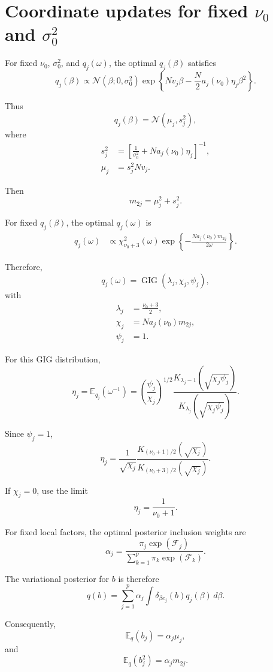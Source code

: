 \documentclass[11pt]{article}
\newcommand{\nuo}{\nu_0}
\newcommand{\sigb}{\sigma_0^2}
\newcommand{\E}{\mathbb E}
\newcommand{\Normal}{\mathcal N}
\newcommand{\GIG}{\operatorname{GIG}}
\newcommand{\chisq}{\chi^2}
\begin{document}
\section{Coordinate updates for fixed \(\nuo\) and \(\sigb\)}

For fixed \(\nuo\), \(\sigb\), and \(q_j(\omega)\), the optimal \(q_j(\beta)\) satisfies
\[
q_j(\beta)
\propto
\Normal(\beta;0,\sigb)
\exp\left\{
Nv_j\beta
-
\frac N2 a_j(\nuo)\eta_j\beta^2
\right\}.
\]

Thus
\[
q_j(\beta)=\Normal(\mu_j,s_j^2),
\]
where
\begin{align}
s_j^2
&=
\left[
\frac{1}{\sigb}
+
N a_j(\nuo)\eta_j
\right]^{-1},
\label{eq:s_update}
\\
\mu_j
&=
s_j^2 Nv_j.
\label{eq:mu_update}
\end{align}

Then
\[
m_{2j}=\mu_j^2+s_j^2.
\]

For fixed \(q_j(\beta)\), the optimal \(q_j(\omega)\) is
\begin{align}
q_j(\omega)
&\propto
\chisq_{\nuo+3}(\omega)
\exp\left\{
-\frac{N a_j(\nuo)m_{2j}}{2\omega}
\right\}.
\end{align}

Therefore,
\[
q_j(\omega)
=
\GIG\left(
\lambda_j,
\chi_j,
\psi_j
\right),
\]
with
\begin{align}
\lambda_j
&=
\frac{\nuo+3}{2},
\\
\chi_j
&=
N a_j(\nuo)m_{2j},
\\
\psi_j
&=
1.
\end{align}

For this GIG distribution,
\[
\eta_j
=
\E_{q_j}(\omega^{-1})
=
\left(\frac{\psi_j}{\chi_j}\right)^{1/2}
\frac{
K_{\lambda_j-1}(\sqrt{\chi_j\psi_j})
}{
K_{\lambda_j}(\sqrt{\chi_j\psi_j})
}.
\]

Since \(\psi_j=1\),
\[
\eta_j
=
\frac{1}{\sqrt{\chi_j}}
\frac{
K_{(\nuo+1)/2}(\sqrt{\chi_j})
}{
K_{(\nuo+3)/2}(\sqrt{\chi_j})
}.
\]

If \(\chi_j=0\), use the limit
\[
\eta_j=\frac{1}{\nuo+1}.
\]

For fixed local factors, the optimal posterior inclusion weights are
\[
\alpha_j
=
\frac{
\pi_j\exp(\mathcal F_j)
}{
\sum_{k=1}^p \pi_k\exp(\mathcal F_k)
}.
\]

The variational posterior for \(b\) is therefore
\[
q(b)
=
\sum_{j=1}^p
\alpha_j
\int
\delta_{\beta e_j}(b)
q_j(\beta)
\,d\beta.
\]

Consequently,
\[
\E_q(b_j)=\alpha_j\mu_j,
\]
and
\[
\E_q(b_j^2)=\alpha_j m_{2j}.
\]
\end{document}
